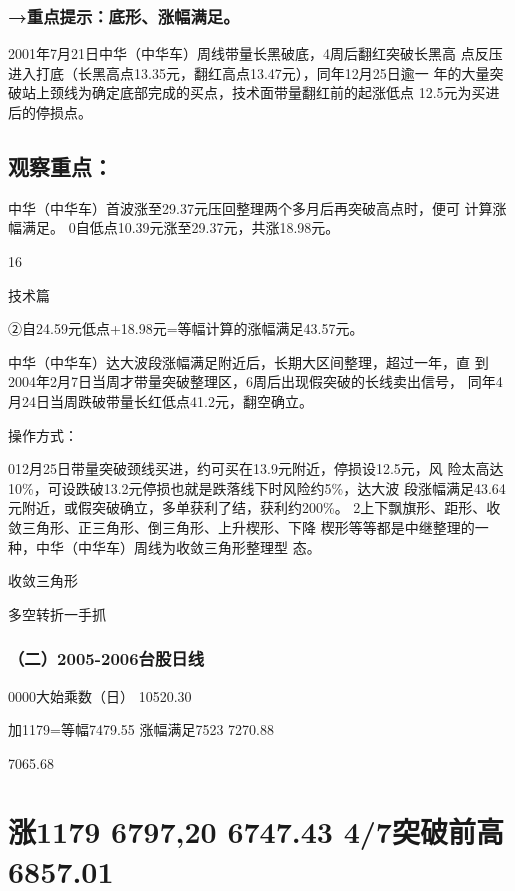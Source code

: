 \documentclass{article}
\begin{document}
\subsubsection{→重点提示：底形、涨幅满足。}

2001年7月21日中华（中华车）周线带量长黑破底，4周后翻红突破长黑高 点反压进入打底（长黑高点13.35元，翻红高点13.47元），同年12月25日逾一 年的大量突破站上颈线为确定底部完成的买点，技术面带量翻红前的起涨低点 12.5元为买进后的停损点。

\subsection{观察重点：}

中华（中华车）首波涨至29.37元压回整理两个多月后再突破高点时，便可 计算涨幅满足。 0自低点10.39元涨至29.37元，共涨18.98元。

16

\clearpage

技术篇

②自24.59元低点+18.98元=等幅计算的涨幅满足43.57元。

中华（中华车）达大波段涨幅满足附近后，长期大区间整理，超过一年，直 到2004年2月7日当周才带量突破整理区，6周后出现假突破的长线卖出信号， 同年4月24日当周跌破带量长红低点41.2元，翻空确立。

操作方式：

012月25日带量突破颈线买进，约可买在13.9元附近，停损设12.5元，风 险太高达10\%，可设跌破13.2元停损也就是跌落线下时风险约5\%，达大波 段涨幅满足43.64元附近，或假突破确立，多单获利了结，获利约200\%。 2上下飘旗形、距形、收敛三角形、正三角形、倒三角形、上升楔形、下降 楔形等等都是中继整理的一种，中华（中华车）周线为收敛三角形整理型 态。

收敛三角形

\clearpage

多空转折一手抓

\subsubsection{（二）2005-2006台股日线}

0000大始乘数（日） 10520.30

加1179=等幅7479.55 涨幅满足7523 7270.88

7065.68

\section{涨1179 6797,20 6747.43 4/7突破前高6857.01}
\end{document}
